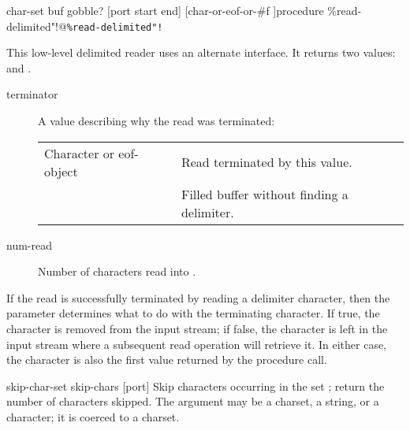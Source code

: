  {char-set buf gobble? [port start end]} 
        {[char-or-eof-or-\#f \integer]}{procedure}
        {\%read-delimited"!@\texttt{\%read-delimited"!}}
\begin{desc}
This low-level delimited reader uses an alternate interface.
It returns two values:  and .
\begin{description}
\item [terminator]
        A value describing why the read was terminated:
        \begin{flushleft}
        \begin{tabular}{l@{\qquad$\Rightarrow$\qquad}l}
        Character or eof-object & Read terminated by this value. \\
        \ex{\#f}                & Filled buffer without finding a delimiter.
        \end{tabular}
        \end{flushleft}

\item [num-read]
        Number of characters read into .
\end{description}

If the read is successfully terminated by reading a delimiter character,
then the  parameter determines what to do with the terminating
character.
If true, the character is removed from the input stream;
if false, the character is left in the input stream where a subsequent
read operation will retrieve it.
In either case, the character is also the first value returned by
the procedure call.
\end{desc}


\begin{defundesc} {skip-char-set} {skip-chars [port]} {\integer}
    Skip characters occurring in the set ;
    return the number of characters skipped.
    The  argument may be a charset, a string, or a
    character; it is coerced to a charset.
\end{defundesc}

